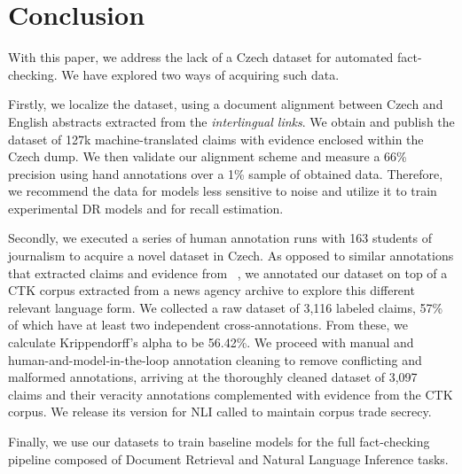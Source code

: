\section{Conclusion}\label{sec:conclusion}

With this paper, we address the lack of a Czech dataset for automated fact-checking.
We have explored two ways of acquiring such data.

Firstly, we localize the \FEN dataset, using a document alignment between Czech and English \Wikipedia abstracts extracted from the \textit{interlingual links}.
We obtain and publish the \FCZ dataset of 127k machine-translated claims with evidence enclosed within the Czech \Wikipedia dump.
We then validate our alignment scheme and measure a 66\% precision using hand annotations over a 1\% sample of obtained data.
Therefore, we recommend the data for models less sensitive to noise and utilize it to train experimental DR models and for recall estimation.

Secondly, we executed a series of human annotation runs with 163 students of journalism to acquire a novel dataset in Czech.
As opposed to similar annotations that extracted claims and evidence from \Wikipedia~\cite{fever2018,norregaard2021danfever,aly2021feverous}, we annotated our dataset on top of a CTK corpus extracted from a news agency archive to explore this different relevant language form. 
We collected a raw dataset of 3,116 labeled claims, 57\% of which have at least two independent cross-annotations.
From these, we calculate Krippendorff's alpha to be 56.42\%.
We proceed with manual and human-and-model-in-the-loop annotation cleaning to remove conflicting and malformed annotations, arriving at the thoroughly cleaned \CTK dataset of 3,097 claims and their veracity annotations complemented with evidence from the CTK corpus.
We release its version for NLI called \CTKNLI to maintain corpus trade secrecy.

Finally, we use our datasets to train baseline models for the full fact-checking pipeline composed of Document Retrieval and Natural Language Inference tasks.

